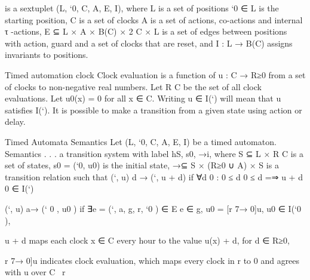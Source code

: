 is a sextuplet (L, `0, C, A, E, I), where
L is a set of positions
`0 ∈ L is the starting position,
C is a set of clocks
A is a set of actions, co-actions and internal τ -actions,
E ⊆ L × A × B(C) × 2
C × L is a set of edges between positions with
action, guard and a set of clocks that are reset, and
I : L → B(C) assigns invariants to positions.

Timed automation clock
Clock evaluation is a function of u : C → R≥0 from a set of clocks
to non-negative real numbers.
Let R
C be the set of all clock evaluations.
Let u0(x) = 0 for all x ∈ C.
Writing u ∈ I(`) will mean that u satisfies I(`).
It is possible to make a transition from a given state using action or
delay.


Timed Automata Semantics
Let (L, `0, C, A, E, I) be a timed automaton.
Semantics . . . a transition system with label hS, s0, →i, where
S ⊆ L × R
C is a set of states,
s0 = (`0, u0) is the initial state,
→⊆ S × (R≥0 ∪ A) × S is a transition relation such that
(`, u)  d → (`, u + d) if ∀d 0 : 0 ≤ d 0 ≤ d =⇒ u + d 0 ∈ I(`)

(`, u) a→ (` 0 , u0 ) if ∃e = (`, a, g, r, `0 ) ∈ E  e ∈ g, u0 = [r 7→ 0]u, u0 ∈ I(`0 ),

u + d maps each clock x ∈ C every hour to the value u(x) + d, for
d ∈ R≥0,


r 7→ 0]u indicates clock evaluation,
which maps every clock in r to 0 and agrees with u over C \ r







